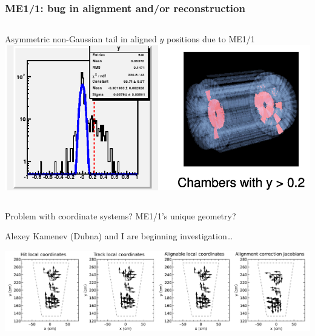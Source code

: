 \documentclass[compress]{beamer}
\begin{document}
\begin{frame}
\frametitle{ME1/1: bug in alignment and/or reconstruction}
\begin{columns}
Asymmetric non-Gaussian tail in aligned $y$ positions due to ME1/1
\includegraphics[width=\linewidth]{me11_broken.png}
\end{columns}

\vspace{0.2 cm}
Problem with coordinate systems?  ME1/1's unique geometry?

\vspace{0.2 cm}
Alexey Kamenev (Dubna) and I are beginning investigation\ldots

\vspace{0.2 cm}
\includegraphics[width=\linewidth]{arrows_side-by-side.png}
\end{frame}
\end{document}
